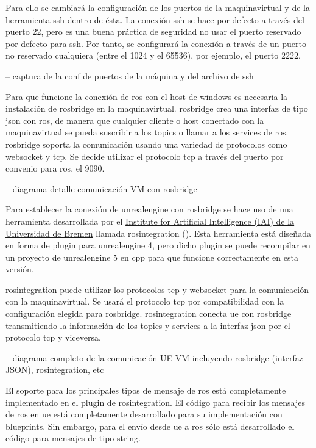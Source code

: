 \documentclass[a4paper, 12pt, spanish, twoside]{article}
\begin{document}
Para ello se cambiará la configuración de los \glspl{puerto} de la \gls{maquinavirtual} y de la herramienta \acrshort{ssh} dentro de ésta. La conexión \acrshort{ssh} se hace por defecto a través del \gls{puerto} 22, pero es una buena práctica de seguridad no usar el \gls{puerto} reservado por defecto para \acrshort{ssh}. Por tanto, se configurará la conexión a través de un \gls{puerto} no reservado cualquiera (entre el 1024 y el 65536), por ejemplo, el \gls{puerto} 2222. 

-- captura de la conf de puertos de la máquina y del archivo de ssh 

Para que funcione la conexión de \acrshort{ros} con el \gls{host} de \gls{windows} es necesaria la instalación de \gls{rosbridge} en la \gls{maquinavirtual}. \gls{rosbridge} crea una interfaz de tipo \acrshort{json} con \acrshort{ros}, de manera que cualquier \gls{cliente} o \gls{host} conectado con la \gls{maquinavirtual} se pueda suscribir a los \glspl{topic} o llamar a los \glspl{service} de \acrshort{ros}. \gls{rosbridge} soporta la comunicación usando una variedad de protocolos como \gls{websocket} y \acrshort{tcp}. Se decide utilizar el protocolo \acrshort{tcp} a través del \gls{puerto} por convenio para \acrshort{ros}, el 9090. 

-- diagrama detalle comunicación VM con rosbridge 

Para establecer la conexión de \gls{unrealengine} con \gls{rosbridge} se hace uso de una herramienta desarrollada por el \href{https://ai.uni-bremen.de/}{Institute for Artificial Intelligence (IAI) de la Universidad de Bremen} llamada \gls{rosintegration} (\cite{mania19scenarios}). Esta herramienta está diseñada en forma de \gls{plugin} para \gls{unrealengine} 4, pero dicho \gls{plugin} se puede recompilar en un proyecto de \gls{unrealengine} 5 en \gls{cpp} para que funcione correctamente en esta versión. 

\gls{rosintegration} puede utilizar los protocolos \acrshort{tcp} y \gls{websocket} para la comunicación con la \gls{maquinavirtual}. Se usará el protocolo \acrshort{tcp} por compatibilidad con la configuración elegida para \gls{rosbridge}. \gls{rosintegration} conecta \acrshort{ue} con \gls{rosbridge} transmitiendo la información de los \glspl{topic} y \glspl{service} a la interfaz \acrshort{json} por el protocolo \acrshort{tcp} y viceversa. 

-- diagrama completo de la comunicación UE-VM incluyendo rosbridge (interfaz JSON), rosintegration, etc 

El soporte para los principales tipos de mensaje de \acrshort{ros} está completamente implementado en el \gls{plugin} de \gls{rosintegration}. El código para recibir los mensajes de \acrshort{ros} en \acrshort{ue} está completamente desarrollado para su implementación con \glspl{blueprint}. Sin embargo, para el envío desde \acrshort{ue} a \acrshort{ros} sólo está desarrollado el código para mensajes de tipo \Gls{string}.  
\end{document}
